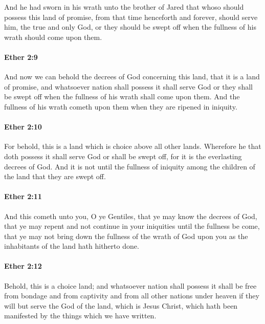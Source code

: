 			And he had sworn in his wrath unto the brother of Jared
			that whoso should possess this land of promise,
			from that time henceforth and forever,
			should serve him, the true and only God,
			or they should be swept off
			when the fullness of his wrath should come upon them.

		\paragraph{Ether 2:9} %
			\label{ETHER-2-9}

			And now we can behold the decrees of God concerning this land,
			that it is a land of promise,
			and whatsoever nation shall possess it shall serve God
			or they shall be swept off
			when the fullness of his wrath shall come upon them.
			And the fullness of his wrath cometh upon them
			when they are ripened in iniquity.

		\paragraph{Ether 2:10} %
			\label{ETHER-2-10}

			For behold, this is a land which is choice above all other lands.
			Wherefore he that doth possess it shall serve God or shall be swept off,
			for it is the everlasting decrees of God.
			And it is not until the fullness of iniquity among the children of the land
			that they are swept off.

		\paragraph{Ether 2:11} %
			\label{ETHER-2-11}

			And this cometh unto you, O ye Gentiles,
			that ye may know the decrees of God,
			that ye may repent and not continue in your iniquities until the fullness be come,
			that ye may not bring down the fullness of the wrath of God upon you
			as the inhabitants of the land hath hitherto done.

		\paragraph{Ether 2:12} %
			\label{ETHER-2-12}

			Behold, this is a choice land;
			and whatsoever nation shall possess it
			shall be free from bondage and from captivity
			and from all other nations under heaven
			if they will but serve the God of the land, which is Jesus Christ,
			which hath been manifested by the things which we have written.

